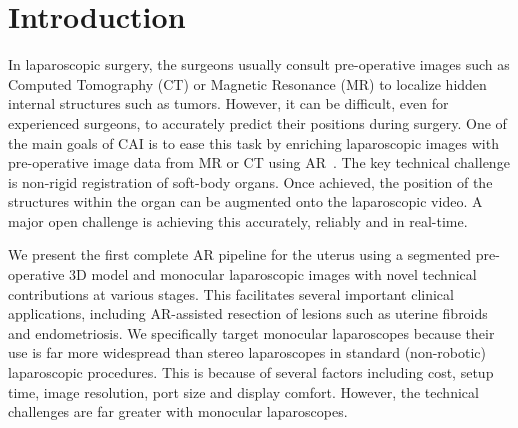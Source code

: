 
\section{Introduction}
In laparoscopic surgery, the surgeons usually consult pre-operative images such as Computed Tomography (CT) or Magnetic Resonance (MR) to localize hidden internal structures such as tumors. However, it can be difficult, even for experienced surgeons, to accurately predict their positions during surgery. 
One of the main goals of CAI is to ease this task by enriching laparoscopic images with pre-operative image data from MR or CT using AR~\cite{1732,8714}. 
The key technical challenge is non-rigid registration of soft-body organs. Once achieved, the position of the structures within the organ can be augmented onto the laparoscopic video. A major open challenge is achieving this accurately, reliably and in real-time. 

We present the first complete AR pipeline for the uterus using a segmented pre-operative 3D model and monocular laparoscopic images with novel technical contributions at various stages. This facilitates several important clinical applications, including AR-assisted resection of lesions such as uterine fibroids and endometriosis.  We specifically target monocular laparoscopes because their use is far more widespread than stereo laparoscopes in standard (non-robotic) laparoscopic procedures. This is because of several factors including
cost, setup time, image resolution, port size
and display comfort. However, the technical challenges are far greater with monocular laparoscopes. 

